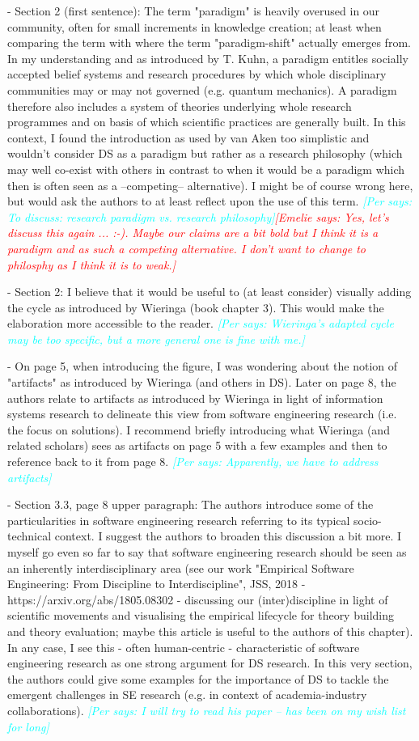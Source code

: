\documentclass{article}
\newcommand{\emelie}[1]{\textcolor{red}{{\it [Emelie says: #1]}}}
\newcommand{\per}[1]{\textcolor{cyan}{{\it [Per says: #1]}}}
\newcommand{\emelie}[1]{}
\newcommand{\per}[1]{}
\begin{document}
- Section 2 (first sentence): The term "paradigm" is heavily overused in our community, often for small increments in knowledge creation; at least when comparing the term with  where the term "paradigm-shift" actually emerges from. In my understanding and as introduced by T. Kuhn, a paradigm entitles socially accepted belief systems and research procedures by which whole disciplinary communities may or may not governed (e.g. quantum mechanics). A paradigm therefore also includes a system of theories underlying whole research programmes and on basis of which scientific practices are generally built. In this context, I found the introduction as used by van Aken too simplistic and wouldn't consider DS as a paradigm but rather as a research philosophy (which may well co-exist with others in contrast to when it would be a paradigm which then is often seen as a --competing-- alternative). I might be of course wrong here, but would ask the authors to at least reflect upon the use of this term. \per{To discuss: research paradigm vs. research philosophy}\emelie{Yes, let's discuss this again ... :-). Maybe our claims are a bit bold but I think it is a paradigm and as such a competing alternative. I don't want to change to philosphy as I think it is to weak.}

- Section 2: I believe that it would be useful to (at least consider) visually adding the cycle as introduced by Wieringa (book chapter 3). This would make the elaboration more accessible to the reader. \per{Wieringa's adapted cycle may be too specific, but a more general one is fine with me.}

- On page 5, when introducing the figure, I was wondering about the notion of "artifacts" as introduced by Wieringa (and others in DS). Later on page 8, the authors relate to artifacts as introduced by Wieringa in light of information systems research to delineate this view from software engineering research (i.e. the focus on solutions). I recommend briefly introducing what Wieringa (and related scholars) sees as artifacts on page 5 with a few examples and then to reference back to it from page 8. \per{Apparently, we have to address artifacts}

- Section 3.3, page 8 upper paragraph: The authors introduce some of the particularities in software engineering research referring to its typical socio-technical context. I suggest the authors to broaden this discussion a bit more. I myself go even so far to say that software engineering research should be seen as an inherently interdisciplinary area (see our work "Empirical Software Engineering: From Discipline to Interdiscipline", JSS, 2018 - https://arxiv.org/abs/1805.08302 - discussing our (inter)discipline in light of scientific movements and visualising the empirical lifecycle for theory building and theory evaluation; maybe this article is useful to the authors of this chapter). In any case, I see this - often human-centric - characteristic of software engineering research as one strong argument for DS research. In this very section, the authors could give some examples for the importance of DS to tackle the emergent challenges in SE research (e.g. in context of academia-industry collaborations). \per{I will try to read his paper -- has been on my wish list for long}
\end{document}
